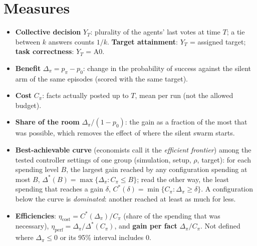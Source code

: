 \documentclass[10pt,a4paper]{article}
\begin{document}
\section{Measures}

\begin{itemize}\itemsep1pt
\item \textbf{Collective decision} $Y_T$: plurality of the agents' last votes at time $T$; a tie between
  $k$ answers counts $1/k$. \textbf{Target attainment}: $Y_T$ = assigned target; \textbf{task
  correctness}: $Y_T$ = A0.
\item \textbf{Benefit} $\Delta_\pi = p_\pi - p_0$: change in the probability of success against the silent
  arm of the same episodes (scored with the same target).
\item \textbf{Cost} $C_\pi$: facts actually posted up to $T$, mean per run (not the allowed budget).
\item \textbf{Share of the room} $\Delta_\pi/(1-p_0)$: the gain as a fraction of the most that was
  possible, which removes the effect of where the silent swarm starts.
\item \textbf{Best-achievable curve} (economists call it the \emph{efficient frontier}) among the tested
  controller settings of one group (simulation, setup, $\rho$, target): for each spending level $B$, the
  largest gain reached by any configuration spending at most $B$, $\Delta^*(B) = \max\{\Delta_\pi : C_\pi \le B\}$;
  read the other way, the least spending that reaches a gain $\delta$, $C^*(\delta) = \min\{C_\pi : \Delta_\pi \ge \delta\}$.
  A configuration below the curve is \emph{dominated}: another reached at least as much for less.
\item \textbf{Efficiencies}: $\eta_{\text{cost}} = C^*(\Delta_\pi)/C_\pi$ (share of the spending that was
  necessary), $\eta_{\text{perf}} = \Delta_\pi/\Delta^*(C_\pi)$, and \textbf{gain per fact} $\Delta_\pi/C_\pi$.
  Not defined where $\Delta_\pi \le 0$ or its 95\% interval includes 0.
\end{itemize}
\end{document}
